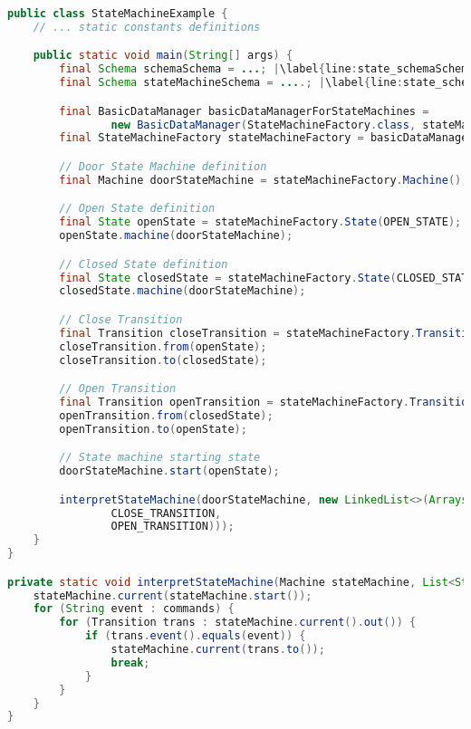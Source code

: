 \begin{sourcecode} [H]
	\begin{lstlisting}[language=Java, escapechar=|]
public class StateMachineExample {
	// ... static constants definitions

	public static void main(String[] args) {
		final Schema schemaSchema = ...; |\label{line:state_schemaSchema}|
		final Schema stateMachineSchema = ....; |\label{line:state_schemaMachineSchema}|

		final BasicDataManager basicDataManagerForStateMachines = 
				new BasicDataManager(StateMachineFactory.class, stateMachineSchema);  |\label{line:state_meaning_full_code}|
		final StateMachineFactory stateMachineFactory = basicDataManagerForStateMachines.make();

		// Door State Machine definition
		final Machine doorStateMachine = stateMachineFactory.Machine(); |\label{line:state_machine_creation_basic}|

		// Open State definition
		final State openState = stateMachineFactory.State(OPEN_STATE);
		openState.machine(doorStateMachine);

		// Closed State definition
		final State closedState = stateMachineFactory.State(CLOSED_STATE);
		closedState.machine(doorStateMachine);

		// Close Transition
		final Transition closeTransition = stateMachineFactory.Transition(CLOSE_TRANSITION);
		closeTransition.from(openState);
		closeTransition.to(closedState);

		// Open Transition
		final Transition openTransition = stateMachineFactory.Transition(OPEN_TRANSITION);
		openTransition.from(closedState);
		openTransition.to(openState);

		// State machine starting state
		doorStateMachine.start(openState);

		interpretStateMachine(doorStateMachine, new LinkedList<>(Arrays.asList(
		        CLOSE_TRANSITION,
		        OPEN_TRANSITION)));
	}
}

private static void interpretStateMachine(Machine stateMachine, List<String> commands) { |\label{line:state_machine_interpreter}|
    stateMachine.current(stateMachine.start());
    for (String event : commands) {
        for (Transition trans : stateMachine.current().out()) {
            if (trans.event().equals(event)) {
                stateMachine.current(trans.to());
                break;
            }
        }
    }
}   
	\end{lstlisting}
	\caption{Door state machine}
	\label{lst:Door_state_machine}
\end{sourcecode}

